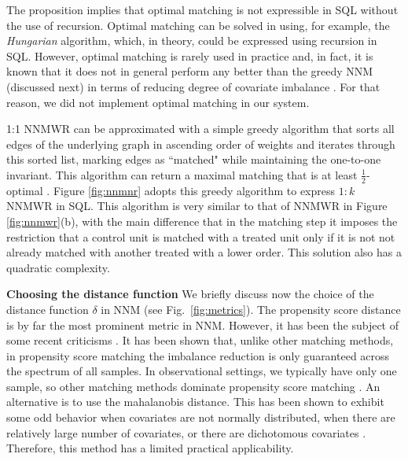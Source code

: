 The proposition implies that optimal matching is not expressible in
SQL without the use of recursion.  Optimal matching can be solved in
\PTIME using, for example, the {\em Hungarian} algorithm, which, in
theory, could be expressed using recursion in SQL.  However, optimal
matching is rarely used in practice and, in fact, it is known that it
does not in general perform any better than the greedy NNM (discussed
next) in terms of reducing degree of covariate imbalance
\cite{Rosenbaum93}.   For that reason, we did not implement optimal
matching in our system.


1:1 NNMWR can be approximated with a simple greedy algorithm that
sorts all edges of the underlying graph in ascending order of weights
and iterates through this sorted list, marking edges as ``matched"
while maintaining the one-to-one invariant. This algorithm can return
a maximal matching that is at least $\frac{1}{2}$-optimal
\cite{Avis83}. Figure \ref{fig:nnmnr} adopts this greedy algorithm to
express $1:k$ NNMWR in SQL.  This algorithm is very similar to that of
NNMWR in Figure \ref{fig:nnmwr}(b), with the main difference that in
the matching step it imposes the restriction that a control unit is
matched with a treated unit only if it is not not already matched with
another treated with a lower order.  This solution also has a
quadratic complexity.

{\bf Choosing the distance function} We briefly discuss now the choice
of the distance function $\delta$ in NNM (see Fig.~\ref{fig:metrics}).
The propensity score distance is by far the most prominent metric in
NNM.  However, it has been the subject of some recent criticisms
\cite{king15}.  It has been shown that, unlike other matching methods,
in propensity score matching the imbalance reduction is only
guaranteed across the spectrum of all samples. In observational
settings, we typically have only one sample, so other matching methods
dominate propensity score matching \cite{king15}. An alternative is to use the mahalanobis distance.  This has been
shown to exhibit some odd behavior when covariates are not normally
distributed, when there are relatively large number of covariates, or
there are dichotomous covariates
\cite{rosenbaum2002observational}. Therefore, this method has a
limited practical applicability.



